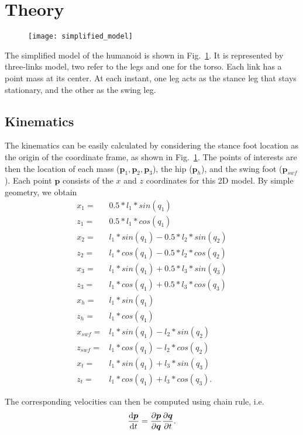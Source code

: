 \section{Theory}
\label{sec:theory}

\begin{figure}[h!]
\centering
\texttt{[image: simplified\_model]}
\label{fig:simplified_model}
\end{figure}

The simplified model of the humanoid is shown in Fig.~\ref{fig:simplified_model}. It is represented by three-links model, two refer to the legs and one for the torso. Each link has a point mass at its center. At each instant, one leg acts as the stance leg that stays stationary, and the other as the swing leg. 

\subsection{Kinematics}
\label{sec:kine}
The kinematics can be easily calculated by considering the stance foot location as the origin of the coordinate frame, as shown in Fig.~\ref{fig:simplified_model}. The points of interests are then the location of each mass ($\bm{p}_1, \bm{p}_2, \bm{p}_3$), the hip ($\bm{p}_h$), and the swing foot ($\bm{p}_{swf}$). Each point $\bm{p}$ consists of the $x$ and $z$ coordinates for this 2D model. By simple geometry, we obtain
\begin{align}
x_1 = &  0.5*l_1*sin(q_1) \\
z_1 = & 0.5*l_1*cos(q_1) \\
x_2 = & l_1*sin(q_1)-0.5*l_2*sin(q_2) \\
z_2 = & l_1*cos(q_1)-0.5*l_2*cos(q_2) \\
x_3 = & l_1*sin(q_1)+ 0.5*l_3*sin(q_3) \\
z_3 = & l_1*cos(q_1)+ 0.5*l_3*cos(q_3) \\
x_h = & l_1*sin(q_1) \\
z_h = & l_1*cos(q_1) \\
x_{swf} = & l_1*sin(q_1)-l_2*sin(q_2) \\
z_{swf} = & l_1*cos(q_1)-l_2*cos(q_2) \\
x_t = & l_1*sin(q_1)+ l_3*sin(q_3) \\
z_t = & l_1*cos(q_1)+ l_3*cos(q_3).
\end{align}

The corresponding velocities can then be computed using chain rule, i.e.
\begin{equation}
\dv{\bm{p}}{t} = \pdv{\bm{p}}{\bm{q}} \pdv{\bm{q}}{t}.
\end{equation}

